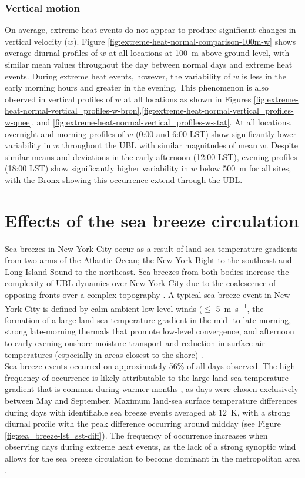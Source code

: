\documentclass[num-refs]{wiley-article}
\begin{document}
\subsubsection{Vertical motion}
On average, extreme heat events do not appear to produce significant changes in vertical velocity ($w$). Figure \ref{fig:extreme-heat-normal-comparison-100m-w} shows average diurnal profiles of $w$ at all locations at \SI{100}{\meter} above ground level, with similar mean values throughout the day between normal days and extreme heat events. During extreme heat events, however, the variability of $w$ is less in the early morning hours and greater in the evening. This phenomenon is also observed in vertical profiles of $w$ at all locations as shown in Figures \ref{fig:extreme-heat-normal-vertical_profiles-w-bron},\ref{fig:extreme-heat-normal-vertical_profiles-w-quee}, and \ref{fig:extreme-heat-normal-vertical_profiles-w-stat}. At all locations, overnight and morning profiles of $w$ (0:00 and 6:00 LST) show significantly lower variability in $w$ throughout the UBL with similar magnitudes of mean $w$. Despite similar means and deviations in the early afternoon (12:00 LST), evening profiles (18:00 LST) show significantly higher variability in $w$ below \SI{500}{\meter} for all sites, with the Bronx showing this occurrence extend through the UBL.

\section{Effects of the sea breeze circulation} \label{section:sea_breeze_effects} 
Sea breezes in New York City occur as a result of land-sea temperature gradients from two arms of the Atlantic Ocean; the New York Bight to the southeast and Long Island Sound to the northeast. Sea breezes from both bodies increase the complexity of UBL dynamics over New York City due to the coalescence of opposing fronts over a complex topography \citep{bornstein1981}. A typical sea breeze event in New York City is defined by calm ambient low-level winds ($\leq$ \SI{5}{\meter\per\second}, the formation of a large land-sea temperature gradient in the mid- to late morning, strong late-morning thermals that promote low-level convergence, and afternoon to early-evening onshore moisture transport and reduction in surface air temperatures (especially in areas closest to the shore) \citep{childs2005, frizzola1963, gedzelman2003}. 
\\
Sea breeze events occurred on approximately 56\% of all days observed. The high frequency of occurrence is likely attributable to the large land-sea temperature gradient that is common during warmer months \citep{gedzelman2003}, as days were chosen exclusively between May and September. Maximum land-sea surface temperature differences during days with identifiable sea breeze events averaged at \SI{12}{\kelvin}, with a strong diurnal profile with the peak difference occurring around midday (see Figure \ref{fig:sea_breeze-lst_sst-diff}). The frequency of occurrence increases when observing days during extreme heat events, as the lack of a strong synoptic wind allows for the sea breeze circulation to become dominant in the metropolitan area \citep{miller2003}. 
\end{document}
